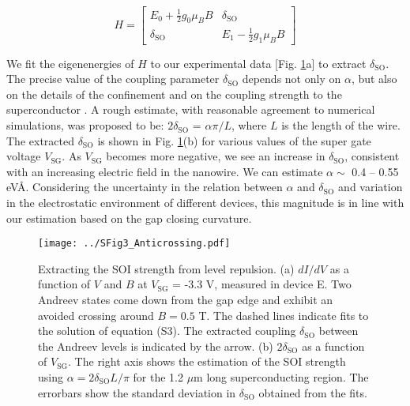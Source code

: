 \documentclass[prl,singlecolumn,notitlepage,secnumroman,superscriptaddress,nobibnotes,graphicx,amsmath,amssymb]{revtex4-2}
\begin{document}
\begin{equation}
H = \begin{bmatrix}
E_0 + \frac{1}{2}g_0 \mu_B B & \delta_{\mathrm{SO}} \\
\delta_{\mathrm{SO}} & E_1 - \frac{1}{2}g_1 \mu_B B
\end{bmatrix}
\end{equation}

We fit the eigenenergies of $H$ to our experimental data [Fig. \ref{fig:SOIlevelrep}a] to extract $\delta_{\mathrm{SO}}$. The precise value of the coupling parameter $\delta_{\mathrm{SO}}$ depends not only on $\alpha$, but also on the details of the confinement and on the coupling strength to the superconductor \cite{DeMoor2018}. A rough estimate, with reasonable agreement to numerical simulations, was proposed to be: $2\delta_{\mathrm{SO}}$ = $\alpha \pi/ L$, where $L$ is the length of the wire. The extracted $\delta_{\mathrm{SO}}$ is shown in Fig. \ref{fig:SOIlevelrep}(b) for various values of the super gate voltage $V_{\mathrm{SG}}$. As $V_{\mathrm{SG}}$ becomes more negative, we see an increase in $\delta_{\mathrm{SO}}$, consistent with an increasing electric field in the nanowire. We can estimate $\alpha \sim$ 0.4 -- 0.55 eV\AA. Considering the uncertainty in the relation between $\alpha$ and $\delta_{\mathrm{SO}}$ and variation in the electrostatic environment of different devices, this magnitude is in line with our estimation based on the gap closing curvature.

\begin{figure}[h]
\texttt{[image: ../SFig3\_Anticrossing.pdf]}
\caption{\label{fig:SOIlevelrep}
	Extracting the SOI strength from level repulsion. 
	(a) $dI/dV$ as a function of $V$ and $B$ at $V_{\mathrm{SG}}$ = -3.3 V, measured in device E. Two Andreev states come down from the gap edge and exhibit an avoided crossing around $B = 0.5$ T. The dashed lines indicate fits to the solution of equation (S3). The extracted coupling $\delta_{\mathrm{SO}}$ between the Andreev levels is indicated by the arrow. (b) $2\delta_{\mathrm{SO}}$ as a function of $V_{\mathrm{SG}}$. The right axis shows the estimation of the SOI strength using $\alpha = 2\delta_{\mathrm{SO}}L/\pi$ for the 1.2 $\mu$m long superconducting region. The errorbars show the standard deviation in $\delta_{\mathrm{SO}}$ obtained from the fits.
}
\end{figure}

\clearpage
\end{document}
